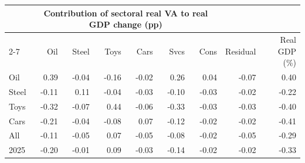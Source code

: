 \begin{tabular}{lrrrrrrrr}
\toprule
 & \multicolumn{6}{c}{Contribution of sectoral real VA to real GDP change (pp)} & & \\
\cmidrule(lr){2-7}
 & Oil & Steel & Toys & Cars & Svcs & Cons & Residual & Real GDP (\%) \\
\midrule
Oil & 0.39 & -0.04 & -0.16 & -0.02 & 0.26 & 0.04 & -0.07 & 0.40 \\
Steel & -0.11 & 0.11 & -0.04 & -0.03 & -0.10 & -0.03 & -0.02 & -0.22 \\
Toys & -0.32 & -0.07 & 0.44 & -0.06 & -0.33 & -0.03 & -0.03 & -0.40 \\
Cars & -0.21 & -0.04 & -0.08 & 0.07 & -0.12 & -0.02 & -0.02 & -0.41 \\
All & -0.11 & -0.05 & 0.07 & -0.05 & -0.08 & -0.02 & -0.05 & -0.29 \\
2025 & -0.20 & -0.01 & 0.09 & -0.03 & -0.14 & -0.02 & -0.02 & -0.33 \\
\bottomrule
\end{tabular}

